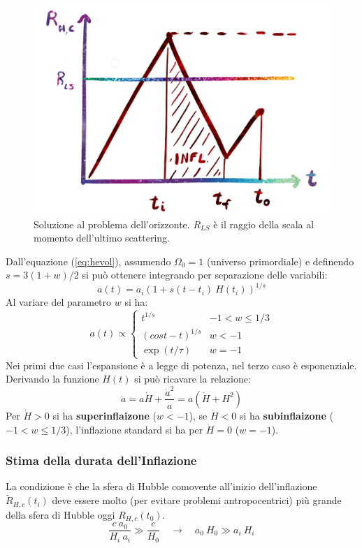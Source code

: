 \begin{figure}[h]
    \centering
    \includegraphics[width=.6\textwidth]{Pictures/4/pbhorsol.png}
    \caption{Soluzione al problema dell'orizzonte. $R_ {LS}$ è il raggio della scala al momento dell'ultimo scattering.}
    \label{fig:4}
\end{figure}

Dall'equazione (\ref{eq:hevol}), assumendo $\Omega_0 = 1$ (universo primordiale) e definendo $s=3(1+w)/2$ si può ottenere integrando per separazione delle variabili:
\begin{equation}
    a(t)=a_i \left( 1+s(t-t_i) ~H(t_i)\right)^{1/s}
\end{equation}
Al variare del parametro $w$ si ha:
\begin{equation}
    a(t) \propto \left\{\begin{matrix}
        t^{1/s} & -1 < w \le 1/3\\ 
        (cost-t)^{1/s} & w<-1 \\
        \exp (t/\tau)&  w=-1
       \end{matrix}\right.
\end{equation}
Nei primi due casi l'espansione è a legge di potenza, nel terzo caso è esponenziale. Derivando la funzione $H(t)$ si può ricavare la relazione:
\begin{equation}
    \ddot{a}= a\dot{H} + \frac{\dot{a}^2}{a} = a \left(  \dot{H} + H^2\right)
\end{equation}
Per $\dot{H}>0$ si ha \textbf{superinflaizone} ($w<-1$), se $\dot{H}<0$ si ha \textbf{subinflaizone} ($-1 < w \le 1/3$), l'inflazione standard si ha per $\dot{H}=0$ ($w=-1$).

\subsubsection{Stima della durata dell'Inflazione}
La condizione è che la sfera di Hubble comovente all'inizio dell'inflazione $\tilde{R}_{H,c}(t_i)$ deve essere molto (per evitare problemi antropocentrici) più grande della sfera di Hubble oggi ${R}_{H,c}(t_0)$.
\begin{equation*}
\frac{c ~a_0}{H_i ~a_i} \gg \frac{c}{H_0} \quad \rightarrow \quad a_0 ~H_0 \gg a_i ~H_i
\end{equation*}

